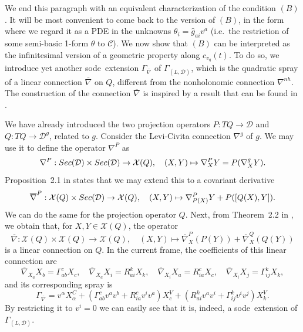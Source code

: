 \documentclass[11pt]{article}
\def\sode{{\sc sode}}
\def\C{{\mathcal C}}
\def\GLD{{\Gamma_{(L,\mathcal{D})}}}
\begin{document}
 We end this paragraph with an equivalent characterization of the   condition $(B)$.
It will be most convenient to come back to the version of $(B)$, in the form where we regard it as a PDE in  the unknowns $\theta_i={\hat g}_{ai}v^a$ (i.e.\ the restriction of some semi-basic 1-form $\theta$ to $\C$). 
We now show that  $(B)$ can be interpreted as the infinitesimal version of a geometric property  along $c_{v_q}(t)$. To do so, we introduce yet {another} \sode\ extension $\Gamma_{\overline\nabla}$ of $\GLD$, which is the quadratic spray  of a linear connection $\overline\nabla$ on $Q$, different from the nonholonomic connection $\nabla^{nh}$. The construction of the connection $\overline\nabla$ is inspired by a result that can be found in \cite{PF}.

We have already introduced the two projection operators $P:TQ\rightarrow \mathcal{D}$ and $Q: TQ\rightarrow \mathcal{D}^g$, related to $g$. Consider the Levi-Civita connection $\nabla^g$ of $g$. We may use it to define the operator $\nabla^P$ as
$$
\nabla^P: {\rm Sec}(\mathcal{D})\times {\rm Sec}(\mathcal{D})\rightarrow\mathcal{X}(Q),\quad (X,Y)\mapsto \nabla^P_X Y= {P}(\nabla^g_X Y).
$$
Proposition~2.1 in \cite{PF} states that we may extend this  to a covariant derivative
$$
\overline{\nabla}^P:\mathcal{X}(Q)\times {\rm Sec}(\mathcal{D}) \rightarrow\mathcal{X}(Q),\quad (X,Y)\mapsto \nabla^P_{P(X)}Y+P([Q(X),Y]).
$$
We can do the same for the projection operator $Q$. Next, from Theorem~2.2 in \cite{PF}, we obtain that, for $X,Y\in\mathcal{X}(Q)$, the operator
$$
\overline\nabla:\mathcal{X}(Q)\times \mathcal{X}(Q)\rightarrow \mathcal{X}(Q),\quad (X,Y)\mapsto \overline{\nabla}^P_X({P}(Y))+\overline{\nabla}^Q_X({Q}(Y))
$$
is a linear connection on $Q$. In the current frame, the coefficients of this linear connection  are
$$
{\overline\nabla}_{X_a}X_b=\Gamma_{ab}^c X_c,\quad {\overline\nabla}_{X_a}X_i=R^k_{ai} X_k,\quad {\overline\nabla}_{X_i} X_a=R^c_{ia} X_c,\quad {\overline\nabla}_{X_i}X_j=\Gamma_{ij}^k X_k,
$$ 
and its corresponding spray is 
$$
\Gamma_{\overline\nabla}=v^\alpha X_\alpha^C+(\Gamma_{ab}^c v^a v^b +R^c_{ia}v^i v^a )X_c^V+ (R^k_{ai} v^a v^i +\Gamma_{ij}^k v^i v^j) X_k^V.
$$
By restricting it to $v^i=0$ we can easily see that it is, indeed, a \sode\ extension of $\GLD$.
\end{document}
